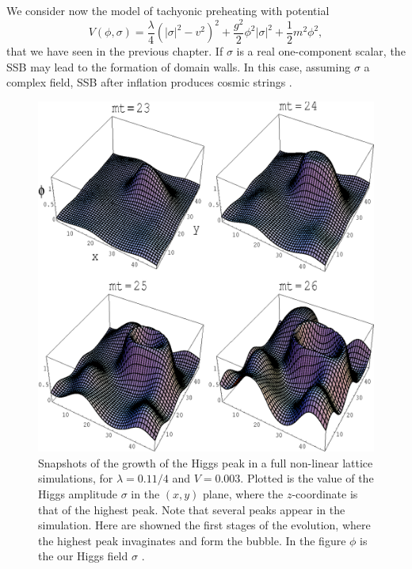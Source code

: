 \documentclass[11pt,a4paper,twoside]{book}
\begin{document}
We consider now the model of tachyonic preheating with potential
\begin{equation}
\label{Chap5:TachyonicPreheatingPotential}
V(\phi,\sigma)=\frac{\lambda}{4}(|\sigma|^{2}-v^{2})^{2} + \frac{g^{2}}{2}\phi^{2}|\sigma|^{2} + \frac{1}{2}m^{2}\phi^{2},
\end{equation}
that we have seen in the previous chapter. If $\sigma$ is a real one-component scalar, the SSB may lead to the formation of domain walls. In this case, assuming $\sigma$ a complex field, SSB after inflation produces cosmic strings \cite{Chap5:DynamicsSymmetryBreaking}. \\
\begin{figure}
	\centering
	\includegraphics[width=0.6\linewidth, height=0.4\textheight]{Images/Chap5/SymmetryBreaking_Fig7}
	\caption{Snapshots of the growth of the Higgs peak in a full non-linear lattice simulations, for $ \lambda=0.11/4 $ and $ V=0.003 $. Plotted is the value of the Higgs amplitude $\sigma$ in the $(x,y) $ plane, where the $ z $-coordinate is that of the highest peak. Note that several peaks appear in the simulation. Here are showned the first stages of the evolution, where the highest peak invaginates and form the bubble. In the figure $\phi$ is the our Higgs field $\sigma$ \cite{Chap5:FalseVacuumDecay}.}
	\label{fig:symmetrybreakingfig7}
\end{figure}
\end{document}
